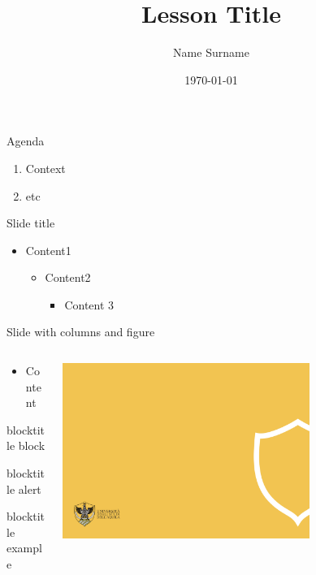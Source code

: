 \documentclass{univaqslides}
\title{Lesson Title}
\author{Name Surname}
\date{\today}
\begin{document}
	\univaqtitlepage
	
	\begin{frame}{Agenda}
		\begin{enumerate}
			\item Context
			\item etc
		\end{enumerate}
	\end{frame}
	
	\begin{frame}{Slide title}
	\begin{itemize}
		\item Content1
		\begin{itemize}
			\item Content2
			\begin{itemize}
				\item Content 3
			\end{itemize}
		\end{itemize}
	\end{itemize}
	\end{frame}


	\begin{frame}{Slide with columns and figure}
		\begin{columns}
			\begin{column}{0.5\textwidth}
				\begin{itemize}
					\item Content
				\end{itemize}
				\begin{block}{blocktitle}		block		\end{block}
				\begin{alertblock}{blocktitle}		alert		\end{alertblock}
				\begin{exampleblock}{blocktitle}		example		\end{exampleblock}
			\end{column}
			\begin{column}{0.5\textwidth}
				\includegraphics[width=0.7\textwidth]{imgs/back43.png}
			\end{column}
		\end{columns}
	\end{frame}
\end{document}
